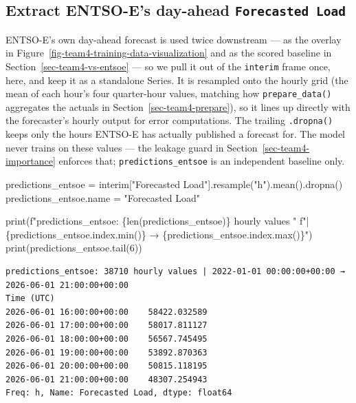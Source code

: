 \documentclass[
  english,
  letterpaper,
]{scrbook}
\newenvironment{Shaded}{\begin{snugshade}}{\end{snugshade}}
\newcommand{\BuiltInTok}[1]{\textcolor[rgb]{0.00,0.23,0.31}{#1}}
\newcommand{\DecValTok}[1]{\textcolor[rgb]{0.68,0.00,0.00}{#1}}
\newcommand{\NormalTok}[1]{\textcolor[rgb]{0.00,0.23,0.31}{#1}}
\newcommand{\OperatorTok}[1]{\textcolor[rgb]{0.37,0.37,0.37}{#1}}
\newcommand{\SpecialCharTok}[1]{\textcolor[rgb]{0.37,0.37,0.37}{#1}}
\newcommand{\SpecialStringTok}[1]{\textcolor[rgb]{0.13,0.47,0.30}{#1}}
\newcommand{\StringTok}[1]{\textcolor[rgb]{0.13,0.47,0.30}{#1}}
\begin{document}
\subsection{\texorpdfstring{Extract ENTSO-E's day-ahead
\texttt{Forecasted\ Load}}{Extract ENTSO-E's day-ahead Forecasted Load}}\label{sec-team4-entsoe-predictions}

ENTSO-E's own day-ahead forecast is used twice downstream --- as the
overlay in Figure~\ref{fig-team4-training-data-visualization} and as the
scored baseline in Section~\ref{sec-team4-vs-entsoe} --- so we pull it
out of the \texttt{interim} frame once, here, and keep it as a
standalone Series. It is resampled onto the hourly grid (the mean of
each hour's four quarter-hour values, matching how
\texttt{prepare\_data()} aggregates the actuals in
Section~\ref{sec-team4-prepare}), so it lines up directly with the
forecaster's hourly output for error computations. The trailing
\texttt{.dropna()} keeps only the hours ENTSO-E has actually published a
forecast for. The model never trains on these values --- the leakage
guard in Section~\ref{sec-team4-importance} enforces that;
\texttt{predictions\_entsoe} is an independent baseline only.

\protect{}\label{team4-entsoe-predictions}
\begin{Shaded}
\begin{Highlighting}[]
\NormalTok{predictions\_entsoe }\OperatorTok{=}\NormalTok{ interim[}\StringTok{"Forecasted Load"}\NormalTok{].resample(}\StringTok{"h"}\NormalTok{).mean().dropna()}
\NormalTok{predictions\_entsoe.name }\OperatorTok{=} \StringTok{"Forecasted Load"}

\BuiltInTok{print}\NormalTok{(}\SpecialStringTok{f"predictions\_entsoe: }\SpecialCharTok{\{}\BuiltInTok{len}\NormalTok{(predictions\_entsoe)}\SpecialCharTok{\}}\SpecialStringTok{ hourly values "}
      \SpecialStringTok{f"| }\SpecialCharTok{\{}\NormalTok{predictions\_entsoe}\SpecialCharTok{.}\NormalTok{index}\SpecialCharTok{.}\BuiltInTok{min}\NormalTok{()}\SpecialCharTok{\}}\SpecialStringTok{ → }\SpecialCharTok{\{}\NormalTok{predictions\_entsoe}\SpecialCharTok{.}\NormalTok{index}\SpecialCharTok{.}\BuiltInTok{max}\NormalTok{()}\SpecialCharTok{\}}\SpecialStringTok{"}\NormalTok{)}
\BuiltInTok{print}\NormalTok{(predictions\_entsoe.tail(}\DecValTok{6}\NormalTok{))}
\end{Highlighting}
\end{Shaded}

\begin{verbatim}
predictions_entsoe: 38710 hourly values | 2022-01-01 00:00:00+00:00 → 2026-06-01 21:00:00+00:00
Time (UTC)
2026-06-01 16:00:00+00:00    58422.032589
2026-06-01 17:00:00+00:00    58017.811127
2026-06-01 18:00:00+00:00    56567.745495
2026-06-01 19:00:00+00:00    53892.870363
2026-06-01 20:00:00+00:00    50815.118195
2026-06-01 21:00:00+00:00    48307.254943
Freq: h, Name: Forecasted Load, dtype: float64
\end{verbatim}
\end{document}
